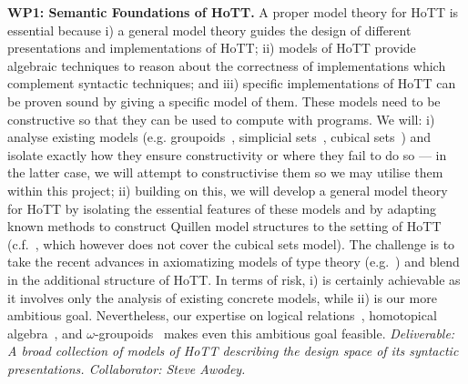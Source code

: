 \documentclass[a4paper,11pt]{article}
\begin{document}
{\bf WP1: Semantic Foundations of HoTT.}  A proper model theory for
HoTT is essential because i) a general model theory guides the design
of different presentations and implementations of HoTT; ii) models of
HoTT provide algebraic techniques to reason about the correctness of
implementations which complement syntactic techniques; and iii)
specific implementations of HoTT can be proven sound by giving a
specific model of them.  These models need to be constructive so that
they can be used to compute with programs.
We will: i) analyse existing
models ({e.g.}  groupoids~\cite{HofmannM:groitt}, simplicial
sets~\cite{KapulkinC:simmuv}, cubical sets~\cite{BezemM:cubsmt}) and
isolate exactly how they ensure constructivity or where they fail to
do so --- in the latter case, we will attempt to constructivise them
so we may utilise them within this project;
ii) building on this, we will develop a general model theory for HoTT
by isolating the essential features of these models and by adapting
known methods to construct Quillen model structures to the setting of
HoTT ({c.f.}~\cite{ShulmanM:uniidh}, which however does not cover the
cubical sets model).  The challenge is to take the recent advances in
axiomatizing models of type theory ({e.g.}~\cite{AwodeyS:natmtt}) and
blend in the additional structure of HoTT. In terms of risk, i) is
certainly achievable as it involves only the analysis of existing
concrete models, while ii) is our more ambitious goal. Nevertheless, our
expertise on logical relations~\cite{neil2014relParamDep},
homotopical algebra~\cite{GambinoN:homl2c,GambinoN:weilsh}, and
$\omega$-groupoids~\cite{alti:csl12,alti:tlca13-hedberg} makes even this ambitious goal
feasible. {\em Deliverable: A broad collection of models of HoTT
  describing the design space of its syntactic presentations.
  Collaborator: Steve Awodey.  }
\end{document}
